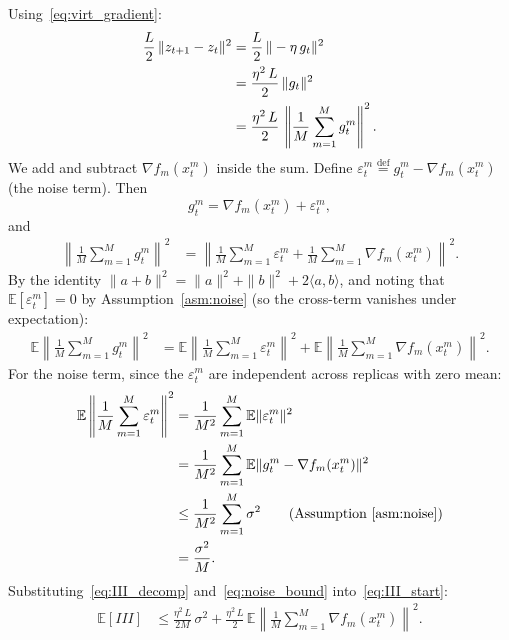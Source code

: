 \documentclass{article}
\begin{document}
Using~\eqref{eq:virt_gradient}:
\begin{align}
\frac{L}{2}\,\|z_{t+1} - z_t\|^2
&= \frac{L}{2}\,\|-\eta\,g_t\|^2 \notag \\
&= \frac{\eta^2\,L}{2}\,\|g_t\|^2 \notag \\
&= \frac{\eta^2\,L}{2}\,\left\|\frac{1}{M}\sum_{m=1}^{M}g_t^m\right\|^2.
\label{eq:III_start}
\end{align}
We add and subtract $\nabla f_m(x_t^m)$ inside the sum. Define
$\varepsilon_t^m \stackrel{\text{def}}{=} g_t^m - \nabla f_m(x_t^m)$
(the noise term). Then
\begin{equation}
g_t^m = \nabla f_m(x_t^m) + \varepsilon_t^m,
\label{eq:noise_def}
\end{equation}
and
\begin{align}
\left\|\frac{1}{M}\sum_{m=1}^{M}g_t^m\right\|^2
&= \left\|\frac{1}{M}\sum_{m=1}^{M}\varepsilon_t^m
   + \frac{1}{M}\sum_{m=1}^{M}\nabla f_m(x_t^m)\right\|^2.
\label{eq:III_split}
\end{align}
By the identity $\|a + b\|^2 = \|a\|^2 + \|b\|^2 + 2\langle a, b\rangle$,
and noting that $\mathbb{E}[\varepsilon_t^m] = 0$ by
Assumption~\ref{asm:noise} (so the cross-term vanishes under expectation):
\begin{align}
\mathbb{E}\left\|\frac{1}{M}\sum_{m=1}^{M}g_t^m\right\|^2
&= \mathbb{E}\left\|\frac{1}{M}\sum_{m=1}^{M}\varepsilon_t^m\right\|^2
   + \mathbb{E}\left\|\frac{1}{M}\sum_{m=1}^{M}
     \nabla f_m(x_t^m)\right\|^2.
\label{eq:III_decomp}
\end{align}
For the noise term, since the $\varepsilon_t^m$ are independent across replicas
with zero mean:
\begin{align}
\mathbb{E}\left\|\frac{1}{M}\sum_{m=1}^{M}\varepsilon_t^m\right\|^2
&= \frac{1}{M^2}\sum_{m=1}^{M}\mathbb{E}\|\varepsilon_t^m\|^2 \notag \\
&= \frac{1}{M^2}\sum_{m=1}^{M}
   \mathbb{E}\|g_t^m - \nabla f_m(x_t^m)\|^2 \notag \\
&\leq \frac{1}{M^2}\sum_{m=1}^{M}\sigma^2
\qquad\text{(Assumption~\ref{asm:noise})} \notag \\
&= \frac{\sigma^2}{M}.
\label{eq:noise_bound}
\end{align}
Substituting~\eqref{eq:III_decomp} and~\eqref{eq:noise_bound}
into~\eqref{eq:III_start}:
\begin{align}
\mathbb{E}[III]
&\leq \frac{\eta^2\,L}{2M}\,\sigma^2
  + \frac{\eta^2\,L}{2}\,\mathbb{E}\left\|\frac{1}{M}\sum_{m=1}^{M}
    \nabla f_m(x_t^m)\right\|^2.
\label{eq:III_final}
\end{align}
\end{document}
